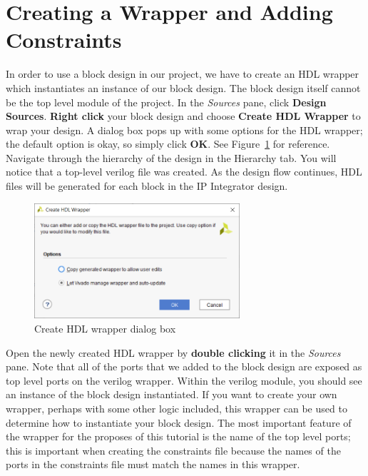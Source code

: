 \documentclass[11pt]{article}
\begin{document}
\section{Creating a Wrapper and Adding Constraints}
\label{sec:wrap_cons}

In order to use a block design in our project, we have to create an HDL wrapper which instantiates an instance of our block design. The block design itself cannot be the top level module of the project. In the \textit{Sources} pane, click \textbf{Design Sources}. \textbf{Right click} your block design and choose \textbf{Create HDL Wrapper} to wrap your design. A dialog box pops up with some options for the HDL wrapper; the default option is okay, so simply click \textbf{OK}. See Figure~\ref{fig:create_wrapper} for reference. Navigate through the hierarchy of the design in the Hierarchy tab. You will notice that a top-level verilog file was created. As the design flow continues, HDL files will be generated for each block in the IP Integrator design.

\begin{figure}[h]
    \centering
    \includegraphics[width=0.68\textwidth]{images/create_wrapper.png}
    \caption{Create HDL wrapper dialog box}
    \label{fig:create_wrapper}
\end{figure}

Open the newly created HDL wrapper by \textbf{double clicking} it in the \textit{Sources} pane. Note that all of the ports that we added to the block design are exposed as top level ports on the verilog wrapper. Within the verilog module, you should see an instance of the block design instantiated. If you want to create your own wrapper, perhaps with some other logic included, this wrapper can be used to determine how to instantiate your block design. The most important feature of the wrapper for the proposes of this tutorial is the name of the top level ports; this is important when creating the constraints file because the names of the ports in the constraints file must match the names in this wrapper.
\end{document}
